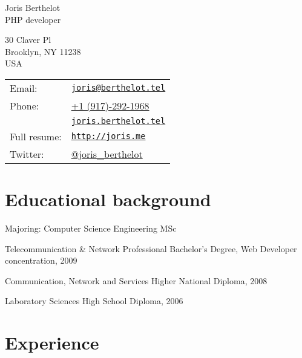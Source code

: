 \documentclass[letterpaper]{article}
\def\name{Joris Berthelot}
\def\title{PHP developer}
\renewenvironment{itemize}{
    \begin{list}{}{
        \setlength{\leftmargin}{1.5em}
    }
}{
    \end{list}
}
\begin{document}
    
    {\Huge \name} \\
    {\Large \title}
    
    
    \vspace{0.25in}
    
    \begin{minipage}{0.6\linewidth}
        30 Claver Pl \\
        Brooklyn, NY 11238 \\
        USA \\
    \end{minipage}
    \begin{minipage}{0.5\linewidth}
        \begin{tabular}{ll}
            Email: & \href{mailto:joris@berthelot.tel}{\tt joris@berthelot.tel} \\
            Phone: & \href{callto:19172921968}{+1 (917)-292-1968} \\
                   & \href{http://joris.berthelot.tel}{\tt joris.berthelot.tel} \\
            Full resume: & \href{http://joris.me}{\tt http://joris.me} \\
            Twitter: & \href{http://twitter.com/joris_berthelot}{@joris\_berthelot}
        \end{tabular}
    \end{minipage}
    
    \section*{Educational background}
        
        \begin{itemize}
            \item Majoring: Computer Science Engineering MSc
            \item Telecommunication \& Network Professional Bachelor's Degree, Web Developer concentration, 2009
            \item Communication, Network and Services Higher National Diploma, 2008
            \item Laboratory Sciences High School Diploma, 2006
        \end{itemize}
        
    \section*{Experience}
        
\end{document}
